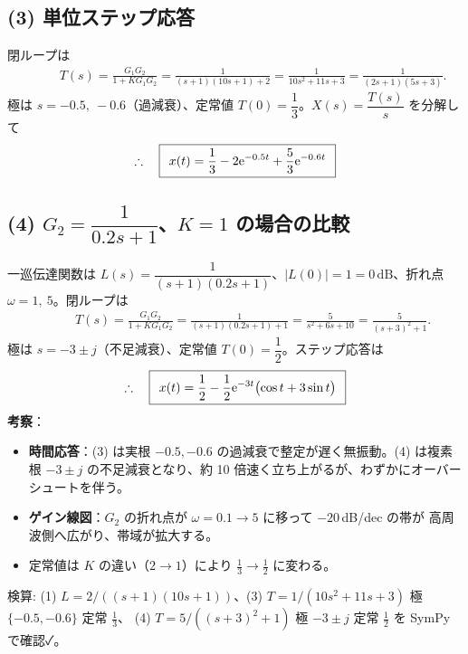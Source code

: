 \documentclass[11pt,a4paper]{article}
\begin{document}
\subsection*{(3) 単位ステップ応答}
閉ループは
\begin{align*}
  &\qquad T(s)=\frac{G_1G_2}{1+KG_1G_2}
   =\frac{1}{(s+1)(10s+1)+2}=\frac{1}{10s^2+11s+3}=\frac{1}{(2s+1)(5s+3)}.
\end{align*}
極は $s=-0.5,\ -0.6$（過減衰）、定常値 $T(0)=\dfrac13$。$X(s)=\dfrac{T(s)}{s}$ を分解して
\[
  \therefore\quad \boxed{\,\;x(t)=\dfrac13-2\mathrm{e}^{-0.5t}+\dfrac53\mathrm{e}^{-0.6t}\;\,}
\]

\begin{center}
\end{center}

\subsection*{(4) $G_2=\dfrac{1}{0.2s+1}$、$K=1$ の場合の比較}
一巡伝達関数は $L(s)=\dfrac{1}{(s+1)(0.2s+1)}$、$|L(0)|=1=0\,\mathrm{dB}$、折れ点 $\omega=1,\ 5$。閉ループは
\begin{align*}
  &\qquad T(s)=\frac{G_1G_2}{1+KG_1G_2}
   =\frac{1}{(s+1)(0.2s+1)+1}=\frac{5}{s^2+6s+10}=\frac{5}{(s+3)^2+1}.
\end{align*}
極は $s=-3\pm j$（不足減衰）、定常値 $T(0)=\dfrac12$。ステップ応答は
\[
  \therefore\quad \boxed{\,\;x(t)=\dfrac12-\dfrac12\mathrm{e}^{-3t}\bigl(\cos t+3\sin t\bigr)\;\,}
\]
\textbf{考察}：
\begin{itemize}\setlength{\itemsep}{1pt}
  \item \textbf{時間応答}：(3) は実根 $-0.5,-0.6$ の過減衰で整定が遅く無振動。(4) は複素根
        $-3\pm j$ の不足減衰となり、約 10 倍速く立ち上がるが、わずかにオーバーシュートを伴う。
  \item \textbf{ゲイン線図}：$G_2$ の折れ点が $\omega=0.1\to5$ に移って $-20\,$dB/dec の帯が
        高周波側へ広がり、帯域が拡大する。
  \item 定常値は $K$ の違い（$2\to1$）により $\tfrac13\to\tfrac12$ に変わる。
\end{itemize}

\bigskip
\noindent 検算: (1) $L=2/((s+1)(10s+1))$、(3) $T=1/(10s^2+11s+3)$ 極 $\{-0.5,-0.6\}$ 定常 $\tfrac13$、
(4) $T=5/((s+3)^2+1)$ 極 $-3\pm j$ 定常 $\tfrac12$ を SymPy で確認✓。
\end{document}
